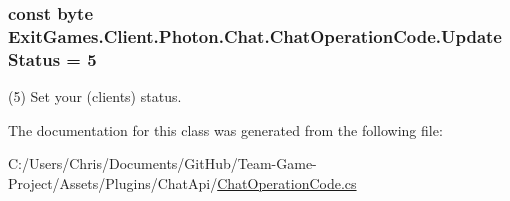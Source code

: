 \subsubsection[{\texorpdfstring{Update\+Status}{UpdateStatus}}]{\setlength{\rightskip}{0pt plus 5cm}const byte Exit\+Games.\+Client.\+Photon.\+Chat.\+Chat\+Operation\+Code.\+Update\+Status = 5}\hypertarget{class_exit_games_1_1_client_1_1_photon_1_1_chat_1_1_chat_operation_code_a76eac50d9c1919c0dfd65cde6d0f2464}{}\label{class_exit_games_1_1_client_1_1_photon_1_1_chat_1_1_chat_operation_code_a76eac50d9c1919c0dfd65cde6d0f2464}


(5) Set your (client\textquotesingle{}s) status.



The documentation for this class was generated from the following file\+:\begin{DoxyCompactItemize}
\item 
C\+:/\+Users/\+Chris/\+Documents/\+Git\+Hub/\+Team-\/\+Game-\/\+Project/\+Assets/\+Plugins/\+Chat\+Api/\hyperlink{_chat_operation_code_8cs}{Chat\+Operation\+Code.\+cs}\end{DoxyCompactItemize}
